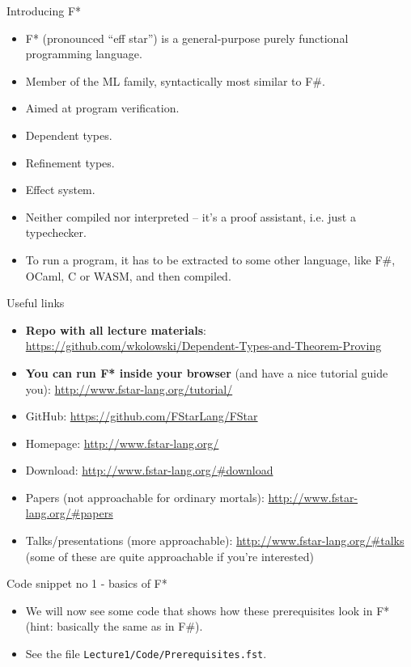 \documentclass{beamer}
\begin{document}
\frame{\tableofcontents}

\begin{frame}{Introducing F*}
\begin{itemize}
	\item F* (pronounced ``eff star'') is a general-purpose purely functional programming language.
	\item Member of the ML family, syntactically most similar to F\#.
	\item Aimed at program verification.
	\item Dependent types.
	\item Refinement types.
	\item Effect system.
	\item Neither compiled nor interpreted -- it's a proof assistant, i.e. just a typechecker.
	\item To run a program, it has to be extracted to some other language, like F\#, OCaml, C or WASM, and then compiled.
\end{itemize}
\end{frame}

\begin{frame}{Useful links}
\begin{itemize}
	\item \textbf{Repo with all lecture materials}: \url{https://github.com/wkolowski/Dependent-Types-and-Theorem-Proving}
	\item \textbf{You can run F* inside your browser} (and have a nice tutorial guide you): \url{http://www.fstar-lang.org/tutorial/}
	\item GitHub: \url{https://github.com/FStarLang/FStar}
	\item Homepage: \url{http://www.fstar-lang.org/}
	\item Download: \url{http://www.fstar-lang.org/\#download}
	\item Papers (not approachable for ordinary mortals): \url{http://www.fstar-lang.org/\#papers}
	\item Talks/presentations (more approachable): \url{http://www.fstar-lang.org/\#talks} (some of these are quite approachable if you're interested)  
\end{itemize}
\end{frame}

\begin{frame}{Code snippet no 1 - basics of F*}
\begin{itemize}
	\item We will now see some code that shows how these prerequisites look in F* (hint: basically the same as in F\#).
	\item See the file \texttt{Lecture1/Code/Prerequisites.fst}.
\end{itemize}
\end{frame}
\end{document}
